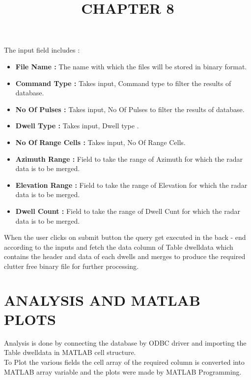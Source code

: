 \documentclass[14pt]{article} %
\begin{document}
  The input field includes :
  \begin{itemize} 
  \item[] \textbf{File Name : } The name with which the files will be stored in binary format.
  \item[] \textbf{Command Type : }Takes input, Command type to filter the results of database. 
  \item[] \textbf{No Of Pulses : }Takes input, No Of Pulses to filter the results of database. 
  \item[] \textbf{Dwell Type : }Takes input, Dwell type .   
  \item[] \textbf{No Of Range Cells : }Takes input, No Of Range Cells.
  \item[] \textbf{Azimuth Range : }Field to take the range of Azimuth for which the radar data is to be merged.
  \item[] \textbf{Elevation Range : }Field to take the range of Elevation for which the radar data is to be merged.
  \item[] \textbf{Dwell Count : }Field to take the range of Dwell Cunt for which the radar data is to be merged.
  \end{itemize}
  When the user clicks on submit button the query get executed in the back - end according to the inputs and fetch the data column of Table dwelldata which contains the header and data of each dwells and merges to produce the required clutter free binary file for further processing.
 
  \title{\huge {CHAPTER 8}}
\maketitle
\section{ANALYSIS AND MATLAB PLOTS}
\noindent Analysis is done by connecting the database by ODBC driver and importing the Table dwelldata in MATLAB cell structure.
\\
To Plot the various fields the cell array of the required column is converted into MATLAB array variable and the plots were made by MATLAB Programming.
\end{document}
